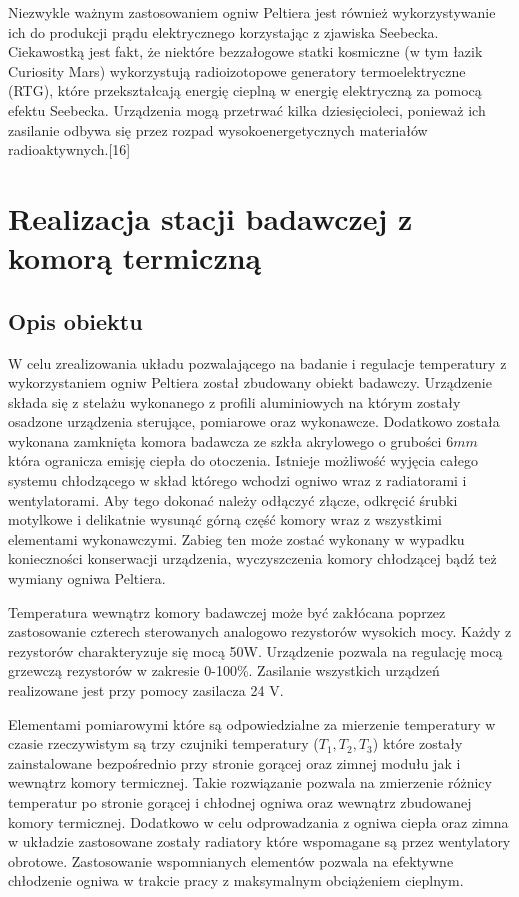 \documentclass[oneside]{mgr}
\begin{document}
Niezwykle ważnym zastosowaniem ogniw Peltiera jest również wykorzystywanie ich do produkcji prądu elektrycznego korzystając z zjawiska Seebecka. Ciekawostką jest fakt, że niektóre bezzałogowe statki kosmiczne (w tym łazik Curiosity Mars) wykorzystują radioizotopowe generatory termoelektryczne (RTG), które przekształcają energię cieplną w energię elektryczną za pomocą efektu Seebecka. Urządzenia mogą przetrwać kilka dziesięcioleci, ponieważ ich zasilanie odbywa się przez rozpad wysokoenergetycznych materiałów radioaktywnych.[16]

\chapter{Realizacja stacji badawczej z komorą termiczną}
\section{Opis obiektu}

W celu zrealizowania układu pozwalającego na badanie i regulacje temperatury z wykorzystaniem ogniw Peltiera został zbudowany obiekt badawczy. Urządzenie składa się z stelażu wykonanego z profili aluminiowych na którym zostały osadzone urządzenia sterujące, pomiarowe oraz wykonawcze. Dodatkowo została wykonana zamknięta komora badawcza ze szkła akrylowego o grubości 6$mm$ która ogranicza emisję ciepła do otoczenia. Istnieje możliwość wyjęcia całego systemu chłodzącego w skład którego wchodzi ogniwo wraz z radiatorami i wentylatorami. Aby tego dokonać należy odłączyć złącze, odkręcić śrubki motylkowe i delikatnie wysunąć górną część komory wraz z wszystkimi elementami wykonawczymi. Zabieg ten może zostać wykonany w wypadku konieczności konserwacji urządzenia, wyczyszczenia komory chłodzącej bądź też wymiany ogniwa Peltiera. 

Temperatura wewnątrz komory badawczej może być zakłócana poprzez zastosowanie czterech sterowanych analogowo rezystorów wysokich mocy. Każdy z rezystorów charakteryzuje się mocą 50W. Urządzenie pozwala na regulację mocą grzewczą rezystorów w zakresie 0-100\%. Zasilanie wszystkich urządzeń realizowane jest przy pomocy zasilacza 24 V.

Elementami pomiarowymi które są odpowiedzialne za mierzenie temperatury  w czasie rzeczywistym są trzy czujniki temperatury ($T_1, T_2, T_3$) które zostały zainstalowane bezpośrednio przy stronie gorącej oraz zimnej modułu jak i wewnątrz komory termicznej. Takie rozwiązanie pozwala na zmierzenie różnicy temperatur po stronie gorącej i chłodnej ogniwa oraz wewnątrz zbudowanej komory termicznej. Dodatkowo w celu odprowadzania z ogniwa ciepła oraz zimna w układzie zastosowane zostały radiatory które wspomagane są przez wentylatory obrotowe. Zastosowanie wspomnianych elementów pozwala na efektywne chłodzenie ogniwa w trakcie pracy z maksymalnym obciążeniem cieplnym.
\end{document}
